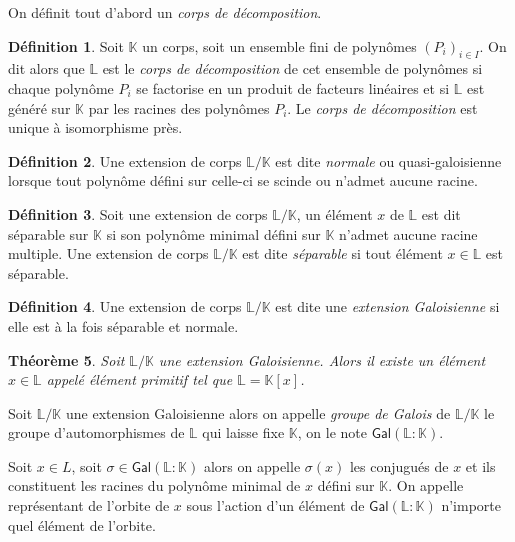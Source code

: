 \documentclass[10pt,a4paper]{book}
\theoremstyle{plain}
\newtheorem{thm}{Théorème}[chapter]
\theoremstyle{definition}
\theoremstyle{definition}
\theoremstyle{definition}
\theoremstyle{definition}
\theoremstyle{definition}
\newtheorem{defi}[thm]{Définition}
\theoremstyle{remark}
\theoremstyle{remark}
\theoremstyle{definition}
\begin{document}
On définit tout d'abord un \emph{corps de décomposition}.
\begin{defi}
Soit $\mathbb{K}$ un corps, soit un ensemble fini de polynômes 
$(P_i)_{i \in I}$. On dit alors que $\mathbb{L}$ est le 
\emph{corps de décomposition} de cet ensemble de polynômes si chaque polynôme
 $P_i$ se factorise en un produit de facteurs linéaires et si 
 $\mathbb{L}$ est généré sur $\mathbb{K}$ par les racines des polynômes $P_i$.
 Le \emph{corps de décomposition} est unique à isomorphisme près. 
\end{defi}

\begin{defi}
Une extension de corps $\mathbb{L}/\mathbb{K}$ est dite \emph{normale} ou quasi-galoisienne lorsque tout polynôme défini sur celle-ci se scinde ou 
n'admet aucune racine.
\end{defi}

\begin{defi}
Soit une extension de corps $\mathbb{L}/\mathbb{K}$, un élément $x$ de 
$\mathbb{L}$ est dit séparable sur $\mathbb{K}$ si son polynôme minimal défini
sur $\mathbb{K}$ n'admet aucune racine multiple. Une extension de corps 
$\mathbb{L}/\mathbb{K}$ est dite \emph{séparable} si tout élément $x \in 
\mathbb{L}$ est séparable.
\end{defi}

\begin{defi}
Une extension de corps $\mathbb{L}/\mathbb{K}$ est dite une \emph{extension 
Galoisienne} si elle est à la fois séparable et normale.
\end{defi}

\begin{thm}
Soit $\mathbb{L}/\mathbb{K}$ une extension Galoisienne. Alors il existe un 
élément $x \in \mathbb{L}$ appelé \emph{élément primitif} tel que $\mathbb{L}=\mathbb{K}[x]$. 
\end{thm}

Soit $\mathbb{L}/\mathbb{K}$ une extension Galoisienne alors on appelle 
\emph{groupe de Galois} de $\mathbb{L}/\mathbb{K}$ le groupe d'automorphismes de
 $\mathbb{L}$ qui laisse fixe $\mathbb{K}$, on le note $\mathsf{Gal}(\mathbb{L}:
 \mathbb{K})$.
 
 Soit $x \in {L}$, soit $\sigma \in \mathsf{Gal}(\mathbb{L}:\mathbb{K})$
 alors on appelle $\sigma(x)$ les conjugués de $x$ et ils constituent les 
 racines du polynôme minimal de $x$ défini sur $\mathbb{K}$. On appelle 
 représentant de l'orbite de $x$ sous l'action d'un élément de $\mathsf{Gal}
 (\mathbb{L}:\mathbb{K})$ n'importe quel élément de l'orbite.
\end{document}
